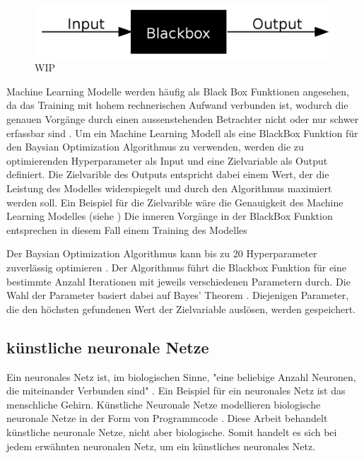 \begin{figure}[!ht]
    \centering
    \includegraphics[width=\textwidth]{images/theorie/blackbox.png}
    \caption{WIP}
    \label{fig:blackbox}
\end{figure}


Machine Learning Modelle werden häufig als Black Box Funktionen angesehen, da
das Training mit hohem rechnerischen Aufwand verbunden ist, wodurch die genauen
Vorgänge durch einen aussenstehenden Betrachter nicht oder nur schwer erfassbar
sind \cite{robbins_machine_2017}. Um ein Machine Learning Modell als eine BlackBox Funktion für
den Baysian Optimization Algorithmus zu verwenden, werden die zu optimierenden
Hyperparameter als Input und eine Zielvariable als Output definiert. Die
Zielvarible des Outputs entspricht dabei einem Wert, der die Leistung des
Modelles widerspiegelt und durch den Algorithmus maximiert werden soll. Ein
Beispiel für die Zielvarible wäre die Genauigkeit des Machine Learning Modelles
(siehe ) Die inneren Vorgänge in der BlackBox Funktion
entsprechen in diesem Fall einem Training des Modelles

Der Baysian Optimization Algorithmus kann bis zu 20 Hyperparameter zuverlässig
optimieren \cite{moriconi_high-dimensional_2020}. Der Algorithmus führt die Blackbox Funktion für eine
bestimmte Anzahl Iterationen mit jeweils verschiedenen Parametern durch. Die
Wahl der Parameter basiert dabei auf Bayes' Theorem \cite[S. 7]{garnett_bayesian_nodate}.
Diejenigen Parameter, die den höchsten gefundenen Wert der Zielvariable
auslösen, werden gespeichert.


\subsection{künstliche neuronale Netze}\label{sub:t_ml_nn} Ein neuronales Netz
ist, im biologischen Sinne, "eine beliebige Anzahl Neuronen, die miteinander
Verbunden sind" \cite{noauthor_neuronales_2021}. Ein Beispiel für ein neuronales
Netz ist das menschliche Gehirn. Künstliche Neuronale Netze modellieren
biologische neuronale Netze in der Form von Programmcode
\cite{noauthor_artificial_nodate}. Diese Arbeit behandelt künstliche neuronale
Netze, nicht aber biologische. Somit handelt es sich bei jedem erwähnten
neuronalen Netz, um ein künstliches neuronales Netz.

